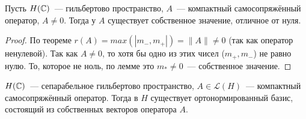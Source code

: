 \begin{lemma}\label{hilbert-smidt:lemma}
        Пусть $H(\mathbb{C})$~--- гильбертово пространство, $A$~--- компактный самосопряжённый оператор, $A \neq 0$.
        Тогда у $A$ существует собственное значение, отличное от нуля.
\end{lemma}

\begin{proof}
    По теореме  $r(A)=max(|m_-, m_+|)= \|A\| \neq 0$ (так как оператор ненулевой).
    Так как $A \neq 0$, то хотя бы одно из этих чисел ($m_+, m_-$) не равно нулю. 
    То, которое не ноль, по лемме  это $m_* \neq 0$~--- собственное значение.
\end{proof}

\begin{theorem}\label{12.5}
    $H(\mathbb{C})$~--- сепарабельное гильбертово пространство, $A \in \mathcal{L}(H)$~--- компактный самосопряжённый оператор. Тогда в $H$ существует ортонормированный базис, состоящий из собственных векторов оператора $A$.
\end{theorem}

